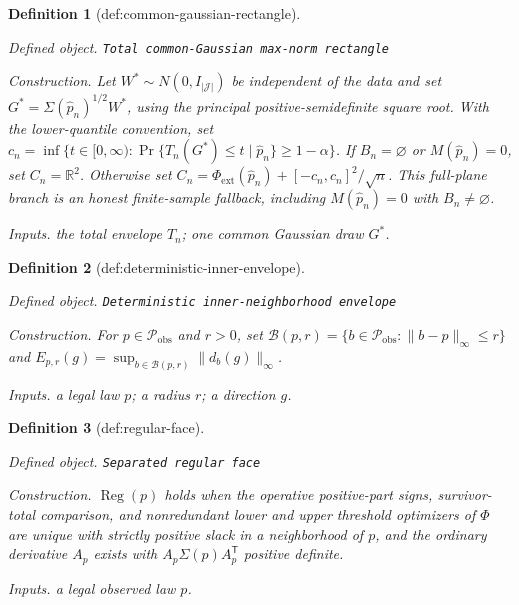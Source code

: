 \documentclass{article}
\newtheorem{definition}{Definition}
\begin{document}
\begin{definition}[def:common-gaussian-rectangle]\label{def:common-gaussian-rectangle}
\par\smallskip\noindent\emph{Defined object.} \texttt{Total common-\allowbreak{}Gaussian max-\allowbreak{}norm rectangle}
\par\smallskip\noindent\emph{Construction.} Let \(W^*\sim N(0,I_{|\mathcal J|})\) be independent of the data and set \(G^*=\Sigma(\widehat p_n)^{1/2}W^*\), using the principal positive-semidefinite square root. With the lower-quantile convention, set \(c_n=\inf\{t\in[0,\infty):\Pr\{T_n(G^*)\le t\mid\widehat p_n\}\ge1-\alpha\}\). If \(B_n=\varnothing\) or \(M(\widehat p_n)=0\), set \(C_n=\mathbb R^2\). Otherwise set \(C_n=\Phi_{\mathrm{ext}}(\widehat p_n)+[-c_n,c_n]^2/\sqrt n\). This full-plane branch is an honest finite-sample fallback, including \(M(\widehat p_n)=0\) with \(B_n\ne\varnothing\).
\par\smallskip\noindent\emph{Inputs.} the total envelope \(T_n\); one common Gaussian draw \(G^*\).
\end{definition}

\begin{definition}[def:deterministic-inner-envelope]\label{def:deterministic-inner-envelope}
\par\smallskip\noindent\emph{Defined object.} \texttt{Deterministic inner-\allowbreak{}neighborhood envelope}
\par\smallskip\noindent\emph{Construction.} For \(p\in\mathcal P_{\mathrm{obs}}\) and \(r>0\), set \(\mathcal B(p,r)=\{b\in\mathcal P_{\mathrm{obs}}:\|b-p\|_\infty\le r\}\) and \(E_{p,r}(g)=\sup_{b\in\mathcal B(p,r)}\|d_b(g)\|_\infty\).
\par\smallskip\noindent\emph{Inputs.} a legal law \(p\); a radius \(r\); a direction \(g\).
\end{definition}

\begin{definition}[def:regular-face]\label{def:regular-face}
\par\smallskip\noindent\emph{Defined object.} \texttt{Separated regular face}
\par\smallskip\noindent\emph{Construction.} \(\operatorname{Reg}(p)\) holds when the operative positive-part signs, survivor-total comparison, and nonredundant lower and upper threshold optimizers of \(\Phi\) are unique with strictly positive slack in a neighborhood of \(p\), and the ordinary derivative \(A_p\) exists with \(A_p\Sigma(p)A_p^{\mathsf T}\) positive definite.
\par\smallskip\noindent\emph{Inputs.} a legal observed law \(p\).
\end{definition}
\end{document}
